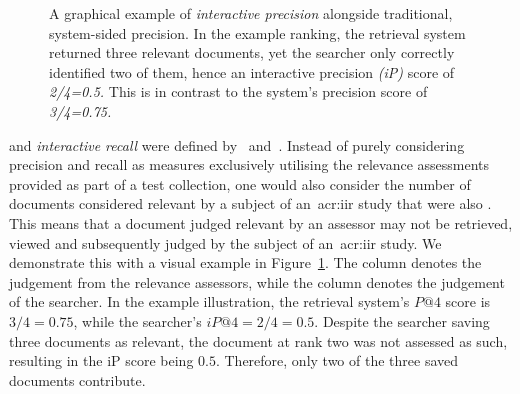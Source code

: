\begin{figure}[t!]
    \centering
    \caption[Comparison of precision and interactive precision]{A graphical example of \emph{interactive precision} alongside traditional, system-sided precision. In the example ranking, the retrieval system returned three relevant documents, yet the searcher only correctly identified two of them, hence an interactive precision \emph{(iP)} score of \emph{2/4=0.5.} This is in contrast to the system's precision score of \emph{3/4=0.75.}}
    \label{fig:interactive_precision}
\end{figure}

 and \emph{interactive recall} were defined by~\cite{veerasamy1996iir} and~\cite{veerasamy1997graphical_display}. Instead of purely considering precision and recall as measures exclusively utilising the relevance assessments provided as part of a test collection, one would also consider the number of documents considered relevant by a subject of an~\gls{acr:iir} study that were also . This means that a document judged relevant by an assessor may not be retrieved, viewed and subsequently judged by the subject of an~\gls{acr:iir} study. We demonstrate this with a visual example in Figure~\ref{fig:interactive_precision}. The  column denotes the judgement from the relevance assessors, while the  column denotes the judgement of the searcher. In the example illustration, the retrieval system's $P@4$ score is $3/4=0.75$, while the searcher's $iP@4 = 2/4 = 0.5$. Despite the searcher saving three documents as relevant, the document at rank two was not assessed as such, resulting in the iP score being $0.5$. Therefore, only two of the three saved documents contribute.

